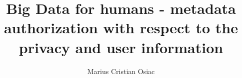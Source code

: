 \documentclass[12pt]{third-rep}
\title{Big Data for humans - metadata authorization with respect to the privacy and user information}
\author{Marius Cristian Osiac}
\begin{document}
\dotitleandabstract

\tableofcontents
\listoffigures
\listoftables
\listoflistings






\appendix

\end{document}
